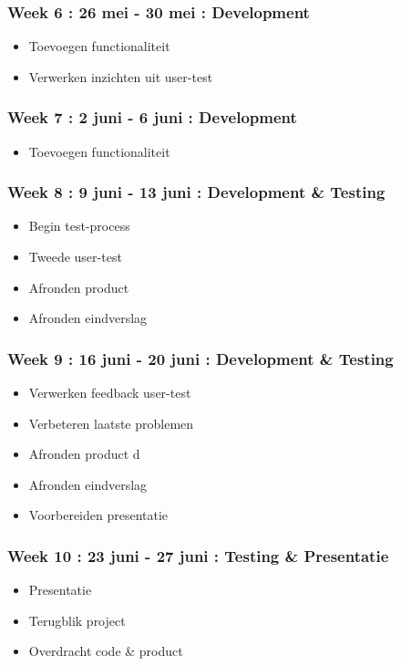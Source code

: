 \subsubsection*{Week 6 : 26 mei - 30 mei : Development}
\begin{itemize}
\item Toevoegen functionaliteit
\item Verwerken inzichten uit user-test
\end{itemize}

\subsubsection*{Week 7 : 2 juni - 6 juni : Development}
\begin{itemize}
\item Toevoegen functionaliteit
\end{itemize}

\subsubsection*{Week 8 : 9 juni - 13 juni : Development \& Testing}
\begin{itemize}
\item Begin test-process
\item Tweede user-test
\item Afronden product
\item Afronden eindverslag
\end{itemize}

\subsubsection*{Week 9 : 16 juni - 20 juni : Development \& Testing}
\begin{itemize}
\item Verwerken feedback user-test
\item Verbeteren laatste problemen
\item Afronden product
d\item Afronden eindverslag
\item Voorbereiden presentatie
\end{itemize}

\subsubsection*{Week 10 : 23 juni - 27 juni : Testing \& Presentatie}
\begin{itemize}
\item Presentatie
\item Terugblik project
\item Overdracht code \& product
\end{itemize}